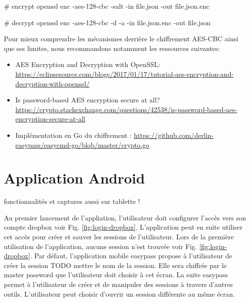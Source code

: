\begin{bashcode}
# encrypt
openssl enc -aes-128-cbc -salt -in file.json -out file.json.enc  

# decrypt
openssl enc -aes-128-cbc -d -a -in file.json.enc -out file.json 
\end{bashcode}


Pour mieux comprendre les mécanismes derrière le chiffrement AES-CBC ainsi que ses limites, nous recommandons notamment les ressources suivantes:

\begin{itemize}
    \item AES Encryption and Decryption with OpenSSL: \url{https://eclipsesource.com/blogs/2017/01/17/tutorial-aes-encryption-and-decryption-with-openssl/}
    \item Is password-based AES encryption secure at all? \url{https://crypto.stackexchange.com/questions/42538/is-password-based-aes-encryption-secure-at-all}
    \item Implémentation en Go du chiffrement \easypass{}: \url{https://github.com/derlin-easypass/easycmd-go/blob/master/crypto.go}
\end{itemize}

\section{Application Android}

fonctionnalités et captures aussi sur tablette !

Au premier lancement de l'appliation, l'utilisateur doit configurer l'accès vers son compte dropbox voir Fig. \ref{fig:login-dropbox}. L'application peut en suite utiliser cet accès pour créer et sauver les sessions de l'utilisateur. Lors de la première utilisation de l'application, aucune session n'est trouvée voir Fig. \ref{fig:login-dropbox}. Par défaut, l'application mobile easypass propose à l'utilisateur de créer la session TODO mettre le nom de la session. Elle sera chiffrée par le master password que l'utilisateur doit choisir à cet écran. La suite easypass permet à l'utilisateur de créer et de manipuler des sessions à travers d'autres outils. L'utilisateur peut choisir d'ouvrir un session  différente au même écran.

\begin{center}
	\begin{minipage}{.3\textwidth}
	\end{minipage}
	\begin{minipage}{.3\textwidth}
	\end{minipage}
	\begin{minipage}{.3\textwidth}
	\end{minipage}        
\end{center}

